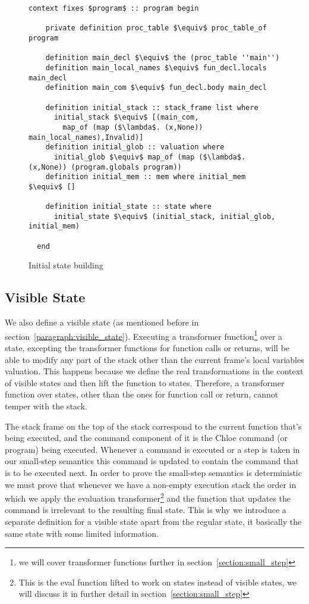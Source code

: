 \begin{figure}
  \begin{lstlisting}[frame=single, mathescape=true]
  context fixes $program$ :: program begin

    private definition proc_table $\equiv$ proc_table_of program

    definition main_decl $\equiv$ the (proc_table ''main'')
    definition main_local_names $\equiv$ fun_decl.locals main_decl
    definition main_com $\equiv$ fun_decl.body main_decl

    definition initial_stack :: stack_frame list where
      initial_stack $\equiv$ [(main_com,
        map_of (map ($\lambda$. (x,None)) main_local_names),Invalid)]
    definition initial_glob :: valuation where
      initial_glob $\equiv$ map_of (map ($\lambda$. (x,None)) (program.globals program))
    definition initial_mem :: mem where initial_mem $\equiv$ []

    definition initial_state :: state where
      initial_state $\equiv$ (initial_stack, initial_glob, initial_mem)

  end
  \end{lstlisting}

  \caption{Initial state building}
  \label{fig:prog_def}
\end{figure}



\subsection{Visible State}\label{subsection:initial_state}
We also define a visible state (as mentioned before in section~\ref{paragraph:visible_state}).
Executing a transformer function\footnote{we will cover transformer functions further in section~\ref{section:small_step}} over a state, excepting the transformer functions for function calls or returns, will be able to modify any part of the stack other than the current frame's local variables valuation.
This happens because we define the real transformations in the context of visible states and then lift the function to states.
Therefore, a transformer function over states, other than the ones for function call or return, cannot temper with the stack.

The stack frame on the top of the stack correspond to the current function that's being executed, and the command component of it is the Chloe command (or program) being executed.
Whenever a command is executed or a step is taken in our small-step semantics this command is updated to contain the command that is to be executed next.
In order to prove the small-step semantics is deterministic we must prove that whenever we have a non-empty execution stack the order in which we apply the evaluation transformer\footnote{This is the eval function lifted to work on states instead of visible states, we will discuss it in further detail in section~\ref{section:small_step}} and the function that updates the command is irrelevant to the resulting final state.
This is why we introduce a separate definition for a visible state apart from the regular state, it basically the same state with some limited information.


